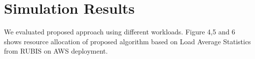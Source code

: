 \section{Simulation Results}
We evaluated proposed approach using different workloads. Figure 4,5 and 6 shows resource allocation of proposed algorithm based on Load Average Statistics from RUBIS on AWS deployment.
